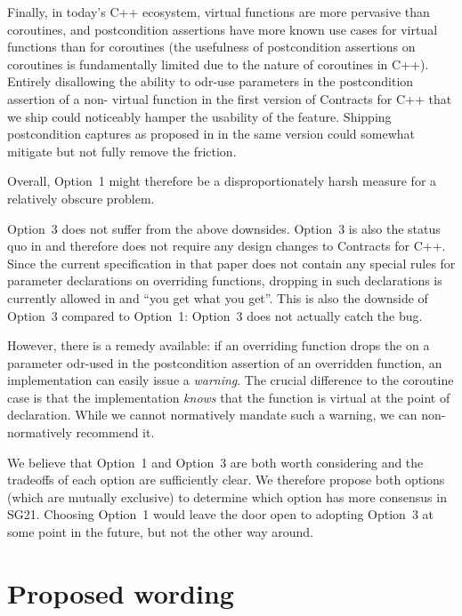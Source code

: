 Finally, in today's C++ ecosystem, virtual functions are more pervasive than coroutines, and postcondition assertions have more known use cases for virtual functions than for coroutines (the usefulness of postcondition assertions on coroutines is fundamentally limited due to the nature of coroutines in C++). Entirely disallowing the ability to odr-use parameters in the postcondition assertion of a non- virtual function in the first version of Contracts for C++ that we ship could noticeably hamper the usability of the feature. Shipping postcondition captures as proposed in \cite{P3098R0} in the same version could somewhat mitigate but not fully remove the friction.

Overall, Option~1 might therefore be a disproportionately harsh measure for a relatively obscure problem.

Option~3 does not suffer from the above downsides. Option~3 is also the status quo in \cite{P2900R10} and therefore does not require any design changes to Contracts for C++. Since the current specification in that paper does not contain any special rules for parameter declarations on overriding functions, dropping  in such declarations is currently allowed in \cite{P2900R10} and ``you get what you get''. This is also the downside of Option~3 compared to Option~1: Option~3 does not actually catch the bug.

However, there is a remedy available: if an overriding function drops the  on a parameter odr-used in the postcondition assertion of an overridden function, an implementation can easily issue a \emph{warning}. The crucial difference to the coroutine case is that the implementation \emph{knows} that the function is virtual at the point of declaration. While we cannot normatively mandate such a warning, we can non-normatively recommend it.

We believe that Option~1 and Option~3 are both worth considering and the tradeoffs of each option are sufficiently clear. We therefore propose both options (which are mutually exclusive) to determine which option has more consensus in SG21.  Choosing Option~1 would leave the door open to adopting Option~3 at some point in the future, but not the other way around.

\pagebreak %

\section{Proposed wording}

